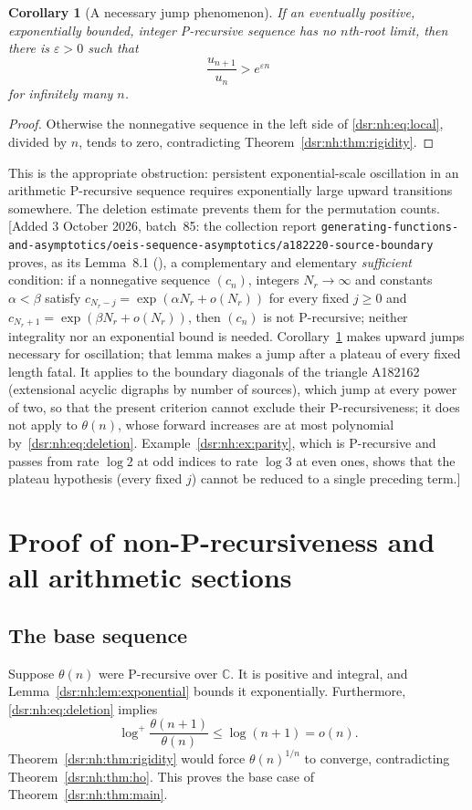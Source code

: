 \documentclass[11pt,a4paper]{article}
\numberwithin{equation}{section}
\newtheorem{corollary}[theorem]{Corollary}
\theoremstyle{definition}
\theoremstyle{remark}
\newcommand{\code}[1]{\texttt{\detokenize{#1}}}
\newcommand{\lean}[1]{\nolinkurl{#1}}
\newcommand{\C}{\mathbb C}
\newcommand{\tht}{\theta}
\newcommand{\logp}{\log^{+}}
\theoremstyle{definition}
\theoremstyle{plain}
\begin{document}
\begin{corollary}[A necessary jump phenomenon]
\label{dsr:nh:cor:jumps}
If an eventually positive, exponentially bounded, integer P-recursive
sequence has no $n$th-root limit, then there is $\varepsilon>0$ such that
\[
\frac{u_{n+1}}{u_n}>e^{\varepsilon n}
\]
for infinitely many $n$.
\end{corollary}
\begin{proof}
Otherwise the nonnegative sequence in the left side of
\eqref{dsr:nh:eq:local}, divided by $n$, tends to zero, contradicting
Theorem~\ref{dsr:nh:thm:rigidity}.
\end{proof}
This is the appropriate obstruction: persistent exponential-scale
oscillation in an arithmetic P-recursive sequence requires exponentially
large upward transitions somewhere. The deletion estimate prevents them
for the permutation counts.
[Added 3 October 2026, batch~85: the collection report
\lean{generating-functions-and-asymptotics/oeis-sequence-asymptotics/a182220-source-boundary}
proves, as its Lemma~8.1 (\code{sbd:lem:jump}), a complementary and
elementary \emph{sufficient} condition: if a nonnegative sequence $(c_n)$,
integers $N_r\to\infty$ and constants $\alpha<\beta$ satisfy
$c_{N_r-j}=\exp(\alpha N_r+o(N_r))$ for every fixed $j\ge0$ and
$c_{N_r+1}=\exp(\beta N_r+o(N_r))$, then $(c_n)$ is not P-recursive;
neither integrality nor an exponential bound is needed.
Corollary~\ref{dsr:nh:cor:jumps} makes upward jumps necessary for
oscillation; that lemma makes a jump after a plateau of every fixed length
fatal. It applies to the boundary diagonals of the triangle A182162
(extensional acyclic digraphs by number of sources), which jump at every
power of two, so that the present criterion cannot exclude their
P-recursiveness; it does not apply to $\tht(n)$, whose forward increases
are at most polynomial by~\eqref{dsr:nh:eq:deletion}.
Example~\ref{dsr:nh:ex:parity}, which is P-recursive and passes from rate
$\log2$ at odd indices to rate $\log3$ at even ones, shows that the
plateau hypothesis (every fixed $j$) cannot be reduced to a single
preceding term.]

\section{Proof of non-P-recursiveness and all arithmetic sections}
\label{dsr:nh:sec:mainproof}
\subsection{The base sequence}
Suppose $\tht(n)$ were P-recursive over $\C$. It is positive and integral,
and Lemma~\ref{dsr:nh:lem:exponential} bounds it exponentially. Furthermore,
\eqref{dsr:nh:eq:deletion} implies
\[
\logp\frac{\tht(n+1)}{\tht(n)}\le\log(n+1)=o(n).
\]
Theorem~\ref{dsr:nh:thm:rigidity} would force $\tht(n)^{1/n}$ to converge,
contradicting Theorem~\ref{dsr:nh:thm:ho}. This proves the base case of
Theorem~\ref{dsr:nh:thm:main}.
\end{document}
